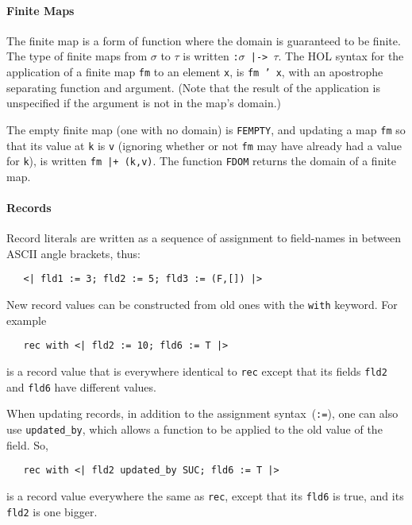 \documentclass[11pt]{article}
\begin{document}
\paragraph{Finite Maps}
The finite map is a form of function where the domain is guaranteed to
be finite.  The type of finite maps from $\sigma$ to $\tau$ is written
\texttt{:$\sigma$~|->~$\tau$}.  The HOL syntax for the application of
a finite map \texttt{fm} to an element \texttt{x}, is \texttt{fm~'~x},
with an apostrophe separating function and argument. %
%
(Note that the result of the application is unspecified if the
argument is not in the map's domain.)

The empty finite map (one with no domain) is \texttt{FEMPTY}, and
updating a map \texttt{fm} so that its value at \texttt{k} is
\texttt{v} (ignoring whether or not \texttt{fm} may have already had a
value for \texttt{k}), is written \texttt{fm |+ (k,v)}. %
%
The function \texttt{FDOM} returns the domain of a finite
map.

\paragraph{Records}
%
Record literals are written as a sequence of assignment to field-names
in between ASCII angle brackets, thus:
\begin{verbatim}
   <| fld1 := 3; fld2 := 5; fld3 := (F,[]) |>
\end{verbatim}
%
New record values can be constructed from old ones with the
\texttt{with} keyword.  For example
\begin{verbatim}
   rec with <| fld2 := 10; fld6 := T |>
\end{verbatim}
is a record value that is everywhere identical to \texttt{rec} except
that its fields \texttt{fld2} and \texttt{fld6} have different
values.

%
When updating records, in addition to the assignment
syntax~(\texttt{:=}), one can also use \texttt{updated_by}, which
allows a function to be applied to the old value of the field.  So,
\begin{verbatim}
   rec with <| fld2 updated_by SUC; fld6 := T |>
\end{verbatim}
is a record value everywhere the same as \texttt{rec}, except that its
\texttt{fld6} is true, and its \texttt{fld2} is one bigger.
\end{document}
